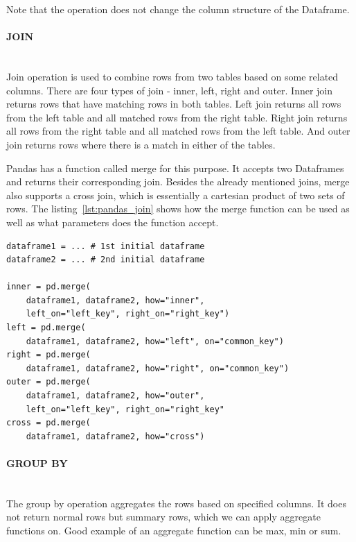 Note that the operation does not change the column structure of the Dataframe.

\paragraph{JOIN} \leavevmode \\

Join operation is used to combine rows from two tables based on some related columns.
There are four types of join - inner, left, right and outer.
Inner join returns rows that have matching rows in both tables.
Left join returns all rows from the left table and all matched rows from the right table.
Right join returns all rows from the right table and all matched rows from the left table.
And outer join returns rows where there is a match in either of the tables.

Pandas has a function called merge for this purpose.
It accepts two Dataframes and returns their corresponding join.
Besides the already mentioned joins, merge also supports a cross join, which is essentially a cartesian product of
two sets of rows.
The listing~\ref{lst:pandas_join} shows how the merge function can be used as well as what parameters does the
function accept.

\begin{lstlisting}[caption=Join in Pandas, label={lst:pandas_join}, captionpos=b]
dataframe1 = ... # 1st initial dataframe
dataframe2 = ... # 2nd initial dataframe

inner = pd.merge(
    dataframe1, dataframe2, how="inner",
    left_on="left_key", right_on="right_key")
left = pd.merge(
    dataframe1, dataframe2, how="left", on="common_key")
right = pd.merge(
    dataframe1, dataframe2, how="right", on="common_key")
outer = pd.merge(
    dataframe1, dataframe2, how="outer",
    left_on="left_key", right_on="right_key"
cross = pd.merge(
    dataframe1, dataframe2, how="cross")
\end{lstlisting}

\paragraph{GROUP BY} \leavevmode \\

The group by operation aggregates the rows based on specified columns.
It does not return normal rows but summary rows, which we can apply aggregate functions on.
Good example of an aggregate function can be max, min or sum.


